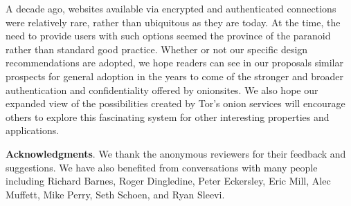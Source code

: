 \documentclass[10pt, conference, compsocconf]{styles/IEEEtran}
\newcommand{\point}[1]{\noindent\textbf{#1}.}
\begin{document}
A decade ago, websites available via encrypted and authenticated
connections were relatively rare, rather than ubiquitous as they are
today.  At the time, the need to provide users with such options
seemed the province of the paranoid rather than standard good
practice. Whether or not our specific design recommendations are
adopted, we hope readers can see in our proposals similar prospects
for general adoption in the years to come of the stronger and broader
authentication and confidentiality offered by onionsites. We also hope
our expanded view of the possibilities created by Tor's onion services
will encourage others to explore this fascinating system for other
interesting properties and applications.


\point{Acknowledgments}
We thank the anonymous reviewers for their feedback and suggestions.
We have also benefited from conversations with many people including
Richard Barnes, Roger Dingledine, Peter Eckersley, Eric Mill, Alec
Muffett, Mike Perry, Seth Schoen, and Ryan Sleevi.



 
\newcommand{\BIBdecl}{\setlength{\itemsep}{0\baselineskip plus 0.1\baselineskip minus 0.1\baselineskip}}
\balance
{\footnotesize 


}

 
%
\end{document}

